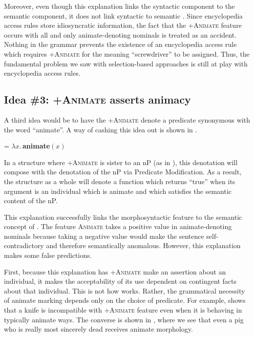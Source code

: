 \documentclass[output=paper
,newtxmath
,modfonts
,nonflat]{langsci/langscibook}
\begin{document}
Moreover, even though this explanation links the syntactic component to the semantic component, it does not link syntactic  to semantic .  Since encyclopedia access rules store idiosyncratic information, the fact that the +\textsc{Animate} feature occurs with all and only animate-denoting nominals is treated as an accident. Nothing in the grammar prevents the existence of an encyclopedia access rule which requires +\textsc{Animate} for the meaning ``screwdriver'' to be assigned.   Thus, the fundamental problem we saw with selection-based approaches is still at play with encyclopedia access rules. 

\subsection{Idea \#3: +\textsc{Animate} asserts animacy} \label{sec:pesetsky:assertanimacy}

A third idea would be to have the +\textsc{Animate} denote a predicate synonymous with the word ``animate''.  A way of cashing this idea out is shown in .

\ea\label{ex:pesetsky:lambdabdas}  = $\lambda x . \,$\textbf{animate}$(x)$ \z

In a structure where +\textsc{Animate} is sister to an nP (as in ), this denotation will compose with the denotation of the nP via Predicate Modification.  As a result, the structure as a whole will denote a function which returns ``true'' when its argument is an individual which is animate and which satisfies the semantic content of the nP. 

This explanation successfully links the morphosyntactic  feature to the semantic concept of .  The feature \textsc{Animate} takes a positive value in animate-denoting nominals because taking a negative value would make the sentence self-contradictory and therefore semantically anomalous.  However, this explanation makes some false predictions.

First, because this explanation has +\textsc{Animate} make an assertion about an individual, it makes the acceptability of its use dependent on contingent facts about that individual.  This is not how  works.  Rather, the grammatical necessity of animate marking depends only on the choice of predicate. For example,  shows that a knife is incompatible with +\textsc{Animate} feature even when it is behaving in typically animate ways.  The converse is shown in , where we see that even a pig who is really most sincerely dead receives animate morphology.
\end{document}
